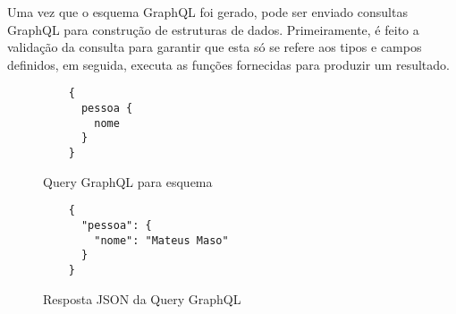 Uma vez que o esquema GraphQL foi gerado, pode ser enviado consultas GraphQL para construção de estruturas de dados. Primeiramente, é feito a validação da consulta para garantir que esta só se refere aos tipos e campos definidos, em seguida, executa as funções fornecidas para produzir um resultado. \cite{GraphQL2016}

\begin{figure}[H]
  \centering
  \begin{verbatim}
    {
      pessoa {
        nome
      }
    }
  \end{verbatim}
  \caption{Query GraphQL para esquema}
\end{figure}

\begin{figure}[H]
  \centering
  \begin{verbatim}
    {
      "pessoa": {
        "nome": "Mateus Maso"
      }
    }
  \end{verbatim}
  \caption{Resposta JSON da Query GraphQL}
\end{figure}




